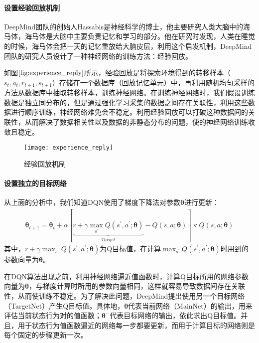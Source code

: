  \paragraph{设置经验回放机制}
DeepMind团队的创始人Hassabis是神经科学的博士，他主要研究人类大脑中的海马体，海马体是大脑中主要负责记忆和学习的部分。他在研究时发现，人类在睡觉的时候，海马体会把一天的记忆重放给大脑皮层，利用这个启发机制，DeepMind团队的研究人员设计了一种神经网络的训练方法：经验回放。

如图$\ref{fig:experience_reply}$所示，经验回放是将探索环境得到的转移样本（$s_{t}, a_{t}, r_{t+1}, s_{t+1}$）存储在一个数据库（回放记忆单元）中，再利用随机均匀采样的方法从数据库中抽取转移样本，训练神经网络。在训练神经网络时，我们假设训练数据是独立同分布的，但是通过强化学习采集的数据之间存在关联性，利用这些数据进行顺序训练，神经网络难免会不稳定。利用经验回放可以打破这种数据间的关联性，从而解决了数据相关性以及数据的非静态分布的问题，使的神经网络训练收敛且稳定。
\begin{figure}[htbp]
\centering
\texttt{[image: experience\_reply]}
\caption{经验回放机制}
\label{fig:experience_reply}
\end{figure}

 \paragraph{设置独立的目标网络}
从上面的分析中，我们知道DQN使用了梯度下降法对参数$\mathbf{\theta}$进行更新：
\begin{equation}
\begin{aligned}
\mathbf{\theta}_{t+1}=\mathbf{\theta}_{t}+\alpha[\underbrace{r+\gamma \max_{s^{'}}Q(s^{'},a^{'};\mathbf{\theta})}_{Target}-Q(s,a;\mathbf{\theta})]\triangledown Q(s,a;\mathbf{\theta})
\end{aligned}
\end{equation}
其中，$r+\gamma \max_{s^{'}}Q(s^{'},a^{'};\mathbf{\theta})$为Q目标值，在计算$\max_{s^{'}}Q(s^{'},a^{'};\mathbf{\theta})$时用到的参数向量为$\mathbf{\theta}$。

在DQN算法出现之前，利用神经网络逼近值函数时，计算Q目标所用的网络参数向量为$\mathbf{\theta}$，与梯度计算时所用的参数向量相同，这样就容易导致数据间存在关联性，从而使训练不稳定。为了解决此问题，DeepMind提出使用另一个目标网络（TargetNet）产生Q目标值。具体地，$\mathbf{\theta}$代表当前网络（MainNet）的输出，用来评估当前状态行为对的值函数；$\mathbf{\theta}^{-}$代表目标网络的输出，依此求出Q目标值。并且，用于状态行为值函数逼近的网络每一步都要更新，而用于计算目标的网络则是每个固定的步骤更新一次。

